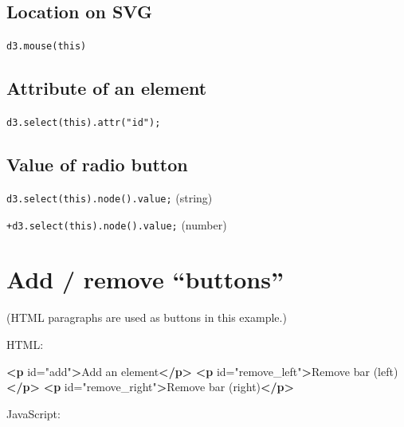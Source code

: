 \documentclass[
  openany]{book}
\newenvironment{Shaded}{\begin{snugshade}}{\end{snugshade}}
\newcommand{\KeywordTok}[1]{\textcolor[rgb]{0.13,0.29,0.53}{\textbf{#1}}}
\newcommand{\NormalTok}[1]{#1}
\newcommand{\OtherTok}[1]{\textcolor[rgb]{0.56,0.35,0.01}{#1}}
\newcommand{\StringTok}[1]{\textcolor[rgb]{0.31,0.60,0.02}{#1}}
\begin{document}
\hypertarget{location-on-svg}{%
\subsection{Location on SVG}\label{location-on-svg}}

\texttt{d3.mouse(this)}

\hypertarget{attribute-of-an-element}{%
\subsection{Attribute of an element}\label{attribute-of-an-element}}

\texttt{d3.select(this).attr("id");}

\hypertarget{value-of-radio-button}{%
\subsection{Value of radio button}\label{value-of-radio-button}}

\texttt{d3.select(this).node().value;} (string)

\texttt{+d3.select(this).node().value;} (number)

\hypertarget{add-remove-buttons}{%
\section{Add / remove ``buttons''}\label{add-remove-buttons}}

(HTML paragraphs are used as buttons in this example.)

HTML:

\begin{Shaded}
\begin{Highlighting}[]
\KeywordTok{\textless{}p}\OtherTok{ id=}\StringTok{"add"}\KeywordTok{\textgreater{}}\NormalTok{Add an element}\KeywordTok{\textless{}/p\textgreater{}}
\KeywordTok{\textless{}p}\OtherTok{ id=}\StringTok{"remove\_left"}\KeywordTok{\textgreater{}}\NormalTok{Remove bar (left)}\KeywordTok{\textless{}/p\textgreater{}}
\KeywordTok{\textless{}p}\OtherTok{ id=}\StringTok{"remove\_right"}\KeywordTok{\textgreater{}}\NormalTok{Remove bar (right)}\KeywordTok{\textless{}/p\textgreater{}}
\end{Highlighting}
\end{Shaded}

JavaScript:
\end{document}
